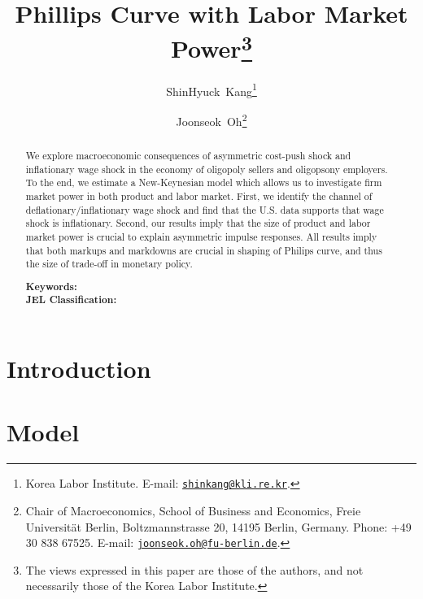 \documentclass[10pt]{article}
\begin{document}
\title{Phillips Curve with Labor Market Power\thanks{The views expressed in this paper are those of the authors, and not necessarily those of the Korea Labor Institute.}} 
\author{ShinHyuck~Kang\thanks{Korea Labor Institute. E-mail: \href{mailto:shinkang@kli.re.kr}{\nolinkurl{shinkang@kli.re.kr}}.}
\and
Joonseok~Oh\thanks{Chair of Macroeconomics, School of Business and Economics, Freie Universit{\"a}t Berlin, Boltzmannstrasse 20, 14195 Berlin, Germany. Phone: +49 30 838 67525. E-mail: \href{mailto:joonseok.oh@fu-berlin.de}{\nolinkurl{joonseok.oh@fu-berlin.de}}.}
}  


\maketitle
\begin{abstract}
\noindent We explore macroeconomic consequences of asymmetric cost-push shock and inflationary wage shock in the economy of oligopoly sellers and oligopsony employers. To the end, we estimate a New-Keynesian model which allows us to investigate firm market power in both product and labor market. First, we identify the channel of deflationary/inflationary wage shock and find that the U.S. data supports that wage shock is inflationary. Second, our results imply that the size of product and labor market power is crucial to explain asymmetric impulse responses. All results imply that both markups and markdowns are crucial in shaping of Philips curve, and thus the size of trade-off in monetary policy.   



\bigskip

\noindent \textbf{Keywords:} \\
\textbf{JEL Classification:}  
\end{abstract}

\clearpage

\section{Introduction}\label{intro}

\section{Model}\label{model}
\citet{Alpanda_Zubairy_2021}
\end{document}
